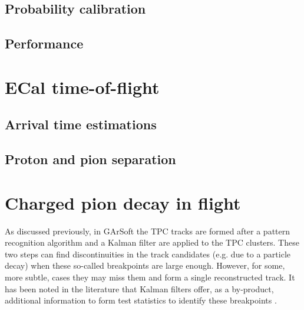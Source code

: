 \subsection{Probability calibration}

\subsection{Performance}

\section{ECal time-of-flight}

\subsection{Arrival time estimations}

\subsection{Proton and pion separation}

\section{Charged pion decay in flight}

As discussed previously, in GArSoft the TPC tracks are formed after a pattern recognition algorithm and a Kalman filter are applied to the TPC clusters. These two steps can find discontinuities in the track candidates (e.g. due to a particle decay) when these so-called breakpoints are large enough. However, for some, more subtle, cases they may miss them and form a single reconstructed track. It has been noted in the literature that Kalman filters offer, as a by-product, additional information to form test statistics to identify these breakpoints \cite{Fruehwirth1988,Astier2000}.

